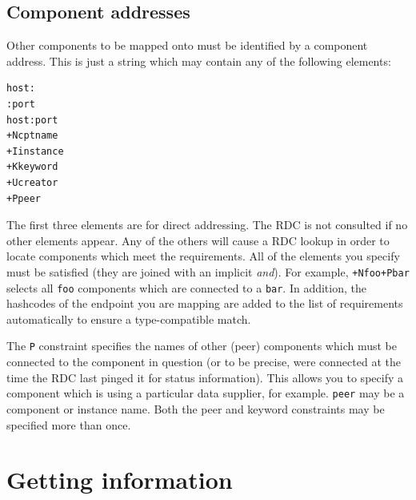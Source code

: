 \documentclass[12pt,a4paper,twoside]{article}
\renewcommand{\_}{\texttt{\symbol{95}}}
\begin{document}
\subsection{Component addresses}

Other components to be mapped onto must be identified by a component
address. This is just a string which may contain any of the following
elements:

\begin{verbatim}
host:
:port
host:port
+Ncptname
+Iinstance
+Kkeyword
+Ucreator
+Ppeer
\end{verbatim}





The first three elements are for direct addressing. The RDC is not
consulted if no other elements appear. Any of the others will
cause a RDC lookup in order to
locate components which meet the requirements. All of the elements
you specify must be satisfied (they are joined with an implicit
\textit{and}).
For example, \verb^+Nfoo+Pbar^ selects all \verb^foo^ components
which are connected to a \verb^bar^.
In addition, the hashcodes of the endpoint you are
mapping are added to the list of requirements automatically to
ensure a type-compatible match.

The \verb^P^ constraint specifies the names of other (peer) components
which must be connected to the component in question (or to be precise,
were connected at the time the RDC last pinged it for status information).
This allows you to
specify a component which is using a particular data supplier, for example.
\verb^peer^ may be a component or instance name.
Both the peer and keyword constraints may be specified more than once.


\section{Getting information}
\end{document}
